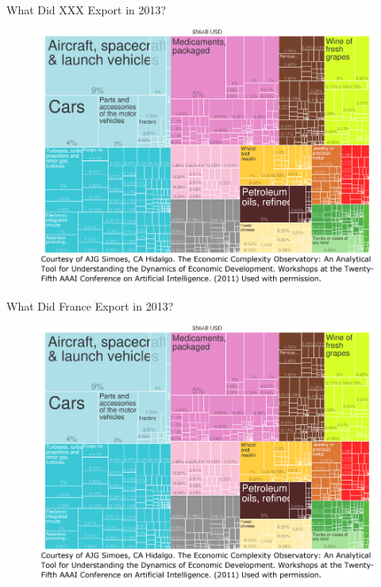 \documentclass[10pt,hyperref={CJKbookmarks=true},xcolor=dvipsnames,aspectratio=169]{beamer}
\begin{document}
\begin{frame}{What Did XXX Export in 2013?}


\begin{figure}
\includegraphics[scale=0.35]{fig/gravity/com2-2.PNG}
\end{figure}

\end{frame}

\begin{frame}{What Did France Export in 2013?}


\begin{figure}
\includegraphics[scale=0.35]{fig/gravity/com2-2.PNG}
\end{figure}

\end{frame}
\end{document}
